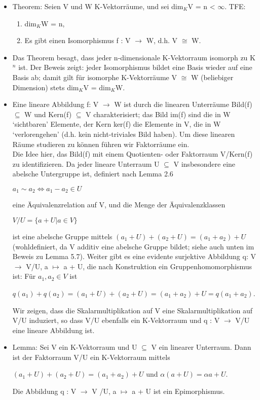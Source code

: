 \begin{itemize}
\begin{compactenum}
\end{compactenum}
\item Theorem: Seien V und W K-Vektorräume, und sei dim$_K$V = n < $\infty$. TFE:
\begin{enumerate}
\item dim$_K$W = n,
\item Es gibt einen Isomorphismus f : V $\to$ W, d.h. V $\cong$ W.
\end{enumerate}
\item 
\begin{remark}
Das Theorem besagt, dass jeder n-dimensionale K-Vektorraum isomorph zu K$^n$ ist. Der Beweis zeigt: jeder Isomorphismus bildet eine Basis wieder auf eine Basis ab; damit gilt für isomorphe K-Vektorräume V $\cong$ W (beliebiger Dimension) stets dim$_K$V = dim$_K$W.
\end{remark}
\item Eine lineare Abbildung f: V $\to$ W ist durch die linearen Unterräume Bild(f) $\subseteq$ W und Kern(f) $\subseteq$ V charakterisiert; das Bild im(f) sind die in W ‘sichtbaren’ Elemente, der Kern ker(f) die Elemente in V, die in W ‘verlorengehen’ (d.h. kein nicht-triviales Bild haben). Um diese linearen Räume studieren zu können führen wir Faktorräume ein.\\
Die Idee hier, das Bild(f) mit einem Quotienten- oder Faktorraum V/Kern(f) zu identifizieren. Da jeder lineare Unterraum U $\subseteq$ V insbesondere eine abelsche Untergruppe ist, definiert nach Lemma 2.6
\begin{center}
$a_1 \sim a_2 \Leftrightarrow a_1 - a_2 \in U$
\end{center}
eine Äquivalenzrelation auf V, und die Menge der Äquivalenzklassen
\begin{center}
$V /U = \{a + U | a \in V \}$
\end{center}
ist eine abelsche Gruppe mittels $(a_1 + U) + (a_2 + U) = (a_1 + a_2) + U$ (wohldefiniert, da V additiv eine abelsche Gruppe bildet; siehe auch unten im Beweis zu Lemma 5.7). Weiter gibt es eine evidente surjektive Abbildung q: V $\to$ V/U, a $\mapsto$ a + U, die nach Konstruktion ein Gruppenhomomorphismus ist: Für $a_1, a_2 \in V$ ist
\begin{center}
$q(a_1)+q(a_2)=(a_1 +U)+(a_2 +U)=(a_1 +a_2)+U =q(a_1 +a_2)$.
\end{center}
Wir zeigen, dass die Skalarmultiplikation auf V eine Skalarmultiplikation auf V/U induziert, so dass V/U ebenfalls ein K-Vektorraum und q : V $\to$ V/U eine lineare Abbildung ist.
\item Lemma: Sei V ein K-Vektorraum und U $\subseteq$ V ein linearer Unterraum. Dann ist der Faktorraum V/U ein K-Vektorraum mittels
\begin{center}
$(a_1 + U)+(a_2 + U)=(a_1 +a_2)+U$ und $\alpha(a+U)=\alpha a+U$.
\end{center} 
Die Abbildung q : V $\to$ V /U, a $\mapsto$ a + U ist ein Epimorphismus.


\end{itemize}
